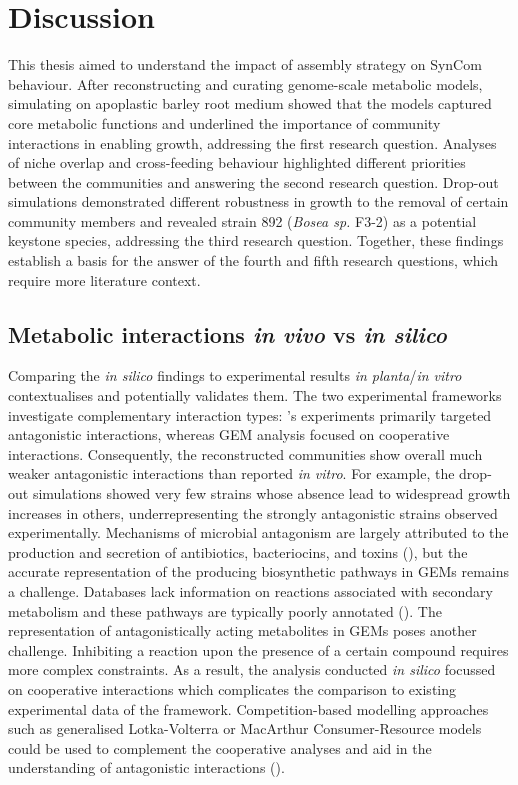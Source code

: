 \chapter{Discussion}
This thesis aimed to understand the impact of assembly strategy on SynCom behaviour. After reconstructing and curating genome-scale metabolic models, simulating on apoplastic barley root medium showed that the models captured core metabolic functions and underlined the importance of community interactions in enabling growth, addressing the first research question. Analyses of niche overlap and cross-feeding behaviour highlighted different priorities between the communities and answering the second research question. Drop-out simulations demonstrated different robustness in growth to the removal of certain community members and revealed strain 892 (\textit{Bosea sp.} F3-2) as a potential keystone species, addressing the third research question. Together, these findings establish a basis for the answer of the fourth and fifth research questions, which require more literature context. 

\section{Metabolic interactions\textit{ in vivo} vs \textit{in silico}}

Comparing the \textit{in silico }findings to experimental results \textit{in planta}/\textit{in vitro} contextualises and potentially validates them. The two experimental frameworks investigate complementary interaction types: \cite{mahdi_low_2026}'s experiments primarily targeted antagonistic interactions, whereas GEM analysis focused on cooperative interactions. Consequently, the reconstructed communities show overall much weaker antagonistic interactions than reported \textit{in vitro}. For example, the drop-out simulations showed very few strains whose absence lead to widespread growth increases in others, underrepresenting the strongly antagonistic strains observed experimentally. Mechanisms of microbial antagonism are largely attributed to the production and secretion of antibiotics, bacteriocins, and toxins (\cite{garcia-bayona_bacterial_2018}), but the accurate representation of the producing biosynthetic pathways in GEMs remains a challenge. Databases lack information on reactions associated with secondary metabolism and these pathways are typically poorly annotated (\cite{qiu_flux_2023}). The representation of antagonistically acting metabolites in GEMs poses another challenge. Inhibiting a reaction upon the presence of a certain compound requires more complex constraints. As a result, the analysis conducted \textit{in silico }focussed on cooperative interactions which complicates the comparison to existing experimental data of the framework. Competition-based modelling approaches such as generalised Lotka-Volterra or MacArthur Consumer-Resource models could be used to complement the cooperative analyses and aid in the understanding of antagonistic interactions (\cite{van_den_berg_ecological_2022}).
\\


